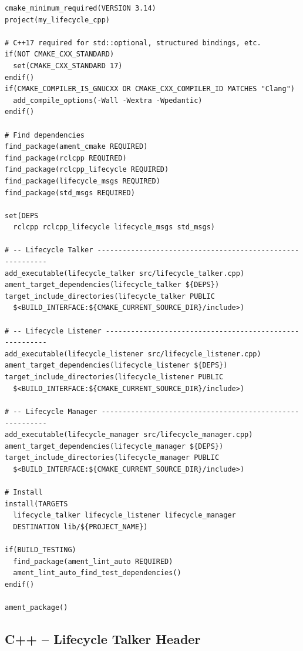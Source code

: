 \documentclass[11pt,a4paper]{csarticle}
\begin{document}
\begin{lstlisting}[style=bash,caption={CMakeLists.txt}]
cmake_minimum_required(VERSION 3.14)
project(my_lifecycle_cpp)

# C++17 required for std::optional, structured bindings, etc.
if(NOT CMAKE_CXX_STANDARD)
  set(CMAKE_CXX_STANDARD 17)
endif()
if(CMAKE_COMPILER_IS_GNUCXX OR CMAKE_CXX_COMPILER_ID MATCHES "Clang")
  add_compile_options(-Wall -Wextra -Wpedantic)
endif()

# Find dependencies
find_package(ament_cmake REQUIRED)
find_package(rclcpp REQUIRED)
find_package(rclcpp_lifecycle REQUIRED)
find_package(lifecycle_msgs REQUIRED)
find_package(std_msgs REQUIRED)

set(DEPS
  rclcpp rclcpp_lifecycle lifecycle_msgs std_msgs)

# -- Lifecycle Talker ----------------------------------------------------------
add_executable(lifecycle_talker src/lifecycle_talker.cpp)
ament_target_dependencies(lifecycle_talker ${DEPS})
target_include_directories(lifecycle_talker PUBLIC
  $<BUILD_INTERFACE:${CMAKE_CURRENT_SOURCE_DIR}/include>)

# -- Lifecycle Listener --------------------------------------------------------
add_executable(lifecycle_listener src/lifecycle_listener.cpp)
ament_target_dependencies(lifecycle_listener ${DEPS})
target_include_directories(lifecycle_listener PUBLIC
  $<BUILD_INTERFACE:${CMAKE_CURRENT_SOURCE_DIR}/include>)

# -- Lifecycle Manager ---------------------------------------------------------
add_executable(lifecycle_manager src/lifecycle_manager.cpp)
ament_target_dependencies(lifecycle_manager ${DEPS})
target_include_directories(lifecycle_manager PUBLIC
  $<BUILD_INTERFACE:${CMAKE_CURRENT_SOURCE_DIR}/include>)

# Install
install(TARGETS
  lifecycle_talker lifecycle_listener lifecycle_manager
  DESTINATION lib/${PROJECT_NAME})

if(BUILD_TESTING)
  find_package(ament_lint_auto REQUIRED)
  ament_lint_auto_find_test_dependencies()
endif()

ament_package()
\end{lstlisting}

\subsection{C++ -- Lifecycle Talker Header}
\end{document}
